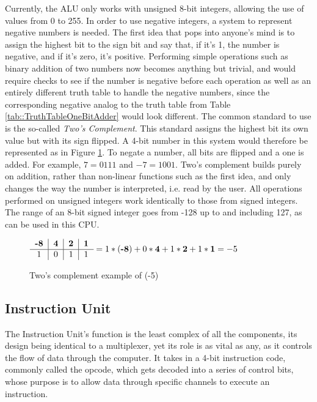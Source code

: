 Currently, the ALU only works with unsigned 8-bit integers, allowing the use of values from 0 to 255. In order to use negative integers, a system to represent negative numbers is needed. The first idea that pops into anyone's mind is to assign the highest bit to the sign bit and say that, if it's 1, the number is negative, and if it's zero, it's positive. Performing simple operations such as binary addition of two numbers now becomes anything but trivial, and would require checks to see if the number is negative before each operation as well as an entirely different truth table to handle the negative numbers, since the corresponding negative analog to the truth table from Table \ref{tab::TruthTableOneBitAdder} would look different. The common standard to use is the so-called \emph{Two's Complement}. This standard assigns the highest bit its own value but with its sign flipped. A 4-bit number in this system would therefore be represented as in Figure \ref{fig::TwosComplement}. To negate a number, all bits are flipped and a one is added. For example, $7 = 0111$ and $-7 = 1001$. Two's complement builds purely on addition, rather than non-linear functions such as the first idea, and only changes the way the number is interpreted, i.e. read by the user. All operations performed on unsigned integers work identically to those from signed integers. The range of an 8-bit signed integer goes from -128 up to and including 127, as can be used in this CPU.

\begin{figure}[!h]
    \begin{center}
        $\begin{tabular}{c|c|c|c}
            \textbf{-8} & \textbf{4} & \textbf{2} & \textbf{1} \\
            \hline
            1 & 0 & 1 & 1\\
        \end{tabular} = 1 * (\textbf{-8}) + 0 * \textbf{4} + 1 * \textbf{2} + 1 * \textbf{1} = -5$
    \end{center}
    \caption[Two's complement example]{Two's complement example of (-5)}
    \label{fig::TwosComplement}
\end{figure}

\subsection{Instruction Unit}
The Instruction Unit's function is the least complex of all the components, its design being identical to a multiplexer, yet its role is as vital as any, as it controls the flow of data through the computer. It takes in a 4-bit instruction code, commonly called the opcode, which gets decoded into a series of control bits, whose purpose is to allow data through specific channels to execute an instruction.

